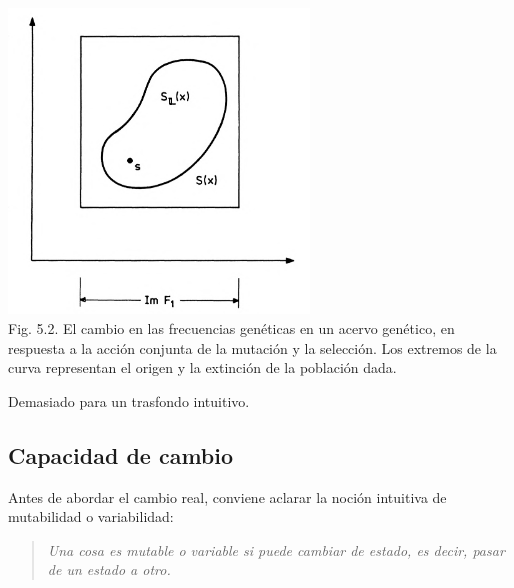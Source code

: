 \begin{justifying}
	\begin{center}
		\includegraphics[width=0.6\textwidth]{img/Figura5-2.png}
		\\ \scriptsize Fig. 5.2. El cambio en las frecuencias genéticas en un acervo genético,
		en respuesta a la acción conjunta de la mutación y la selección.
		Los extremos de la curva representan el origen y la extinción de la población dada.
	\end{center}
    Demasiado para un trasfondo intuitivo.

    \subsection{Capacidad de cambio}
    Antes de abordar el cambio real, conviene aclarar la noción intuitiva
    de mutabilidad o variabilidad:

    \begin{quote}
    	\textit{Una cosa es mutable o variable si puede cambiar de estado, es decir,
    	pasar de un estado a otro.}
    \end{quote}
    

\end{justifying}